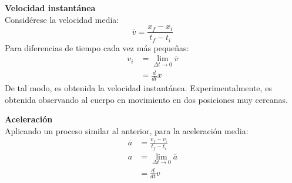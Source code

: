 \documentclass[../main]{subfiles}
\begin{document}
\textbf{Velocidad instantánea}\\
Considérese la velocidad media:
\begin{equation*}
  \overline{v} = \frac{x_f - x_i}{t_f - t_i}
\end{equation*}
Para diferencias de tiempo cada vez más pequeñas:
\begin{align*}
  v_i &= \lim_{\Delta t \to 0} \overline{v}\\
      &= \frac{d}{dt} x
\end{align*}
De tal modo, es obtenida la velocidad instantánea.
Experimentalmente, es obtenida observando al cuerpo en movimiento en dos posiciones muy cercanas. \parencite{book:alonso1970}

\textbf{Aceleración}\\
Aplicando un proceso similar al anterior, para la aceleración media: \parencite{book:alonso1970}
\begin{align*}
  \overline{a} &= \frac{v_f - v_i}{t_f - t_i}\\
  a &= \lim_{\Delta t \to 0} \overline{a}\\
    &= \frac{d}{dt} v
\end{align*}
\end{document}
